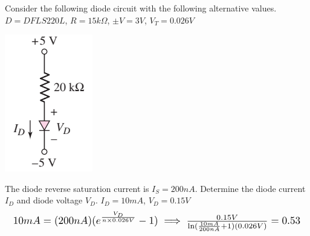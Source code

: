 \documentclass[12pt,letterpaper,titlepage]{article}
\begin{document}
\begin{raggedright}
Consider the following diode circuit with the following alternative values. $D=DFLS220L$, $R = 15k\Omega$, $\pm V = 3V$, $V_T = 0.026V$
\begin{center}
\includegraphics[width=\textwidth, height=7\baselineskip, keepaspectratio=true]{ds2}
\end{center}

The diode reverse saturation current is $I_S = 200nA$. Determine the diode current $I_D$ and diode voltage $V_D$. $I_D = 10mA$, $V_D = 0.15V$
\begin{equation}\scalebox{1.25}{
$
10mA = (200 nA)(e^{\frac{V_D}{n\times 0.026V}} - 1) \implies \frac{0.15V}{\ln(\frac{10mA}{200nA}+1)(0.026V)} = 0.53
$
}
\end{equation}


\end{raggedright}
\end{document}
